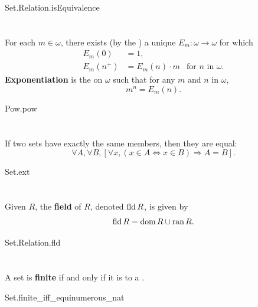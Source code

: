 \documentclass{report}
\begin{document}
    {Set.Relation.isEquivalence}

\section{}%

  For each $m \in \omega$, there exists (by the
    ) a unique
     $E_m \colon \omega \rightarrow \omega$ for which
    \begin{align*}
      E_m(0) & = 1, \\
      E_m(n^+) & = E_m(n) \cdot m & \text{for } n \text{ in } \omega.
    \end{align*}
  \textbf{Exponentiation} is the  on $\omega$
    such that for any $m$ and $n$ in $\omega$, $$m^n = E_m(n).$$

    {Pow.pow}

\section{}%

  If two sets have exactly the same members, then they are equal:
    $$\forall A, \forall B,
        \left[\forall x, (x \in A \iff x \in B) \Rightarrow A = B\right].$$

    {Set.ext}

\section{}%

  Given  $R$, the \textbf{field} of $R$, denoted $\mathop{\text{fld}}{R}$,
    is given by $$\mathop{\text{fld}}{R} = \mathop{\text{dom}}{R} \cup \mathop{\text{ran}}{R}.$$

    {Set.Relation.fld}

\section{}%

  A set is \textbf{finite} if and only if it is  to a
    .

    {Set.finite\_iff\_equinumerous\_nat}
\end{document}
